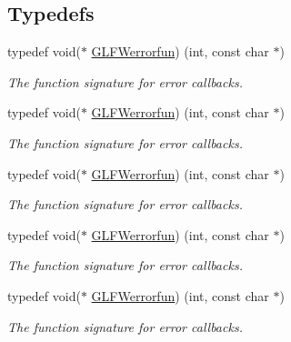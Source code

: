 \subsection*{Typedefs}
\begin{DoxyCompactItemize}
\item 
typedef void($\ast$ \hyperlink{group__init_ga6b8a2639706d5c409fc1287e8f55e928}{G\+L\+F\+Werrorfun}) (int, const char $\ast$)
\begin{DoxyCompactList}\small\item\em The function signature for error callbacks. \end{DoxyCompactList}\item 
typedef void($\ast$ \hyperlink{group__init_ga6b8a2639706d5c409fc1287e8f55e928}{G\+L\+F\+Werrorfun}) (int, const char $\ast$)
\begin{DoxyCompactList}\small\item\em The function signature for error callbacks. \end{DoxyCompactList}\item 
typedef void($\ast$ \hyperlink{group__init_ga6b8a2639706d5c409fc1287e8f55e928}{G\+L\+F\+Werrorfun}) (int, const char $\ast$)
\begin{DoxyCompactList}\small\item\em The function signature for error callbacks. \end{DoxyCompactList}\item 
typedef void($\ast$ \hyperlink{group__init_ga6b8a2639706d5c409fc1287e8f55e928}{G\+L\+F\+Werrorfun}) (int, const char $\ast$)
\begin{DoxyCompactList}\small\item\em The function signature for error callbacks. \end{DoxyCompactList}\item 
typedef void($\ast$ \hyperlink{group__init_ga6b8a2639706d5c409fc1287e8f55e928}{G\+L\+F\+Werrorfun}) (int, const char $\ast$)
\begin{DoxyCompactList}\small\item\em The function signature for error callbacks. \end{DoxyCompactList}\end{DoxyCompactItemize}

